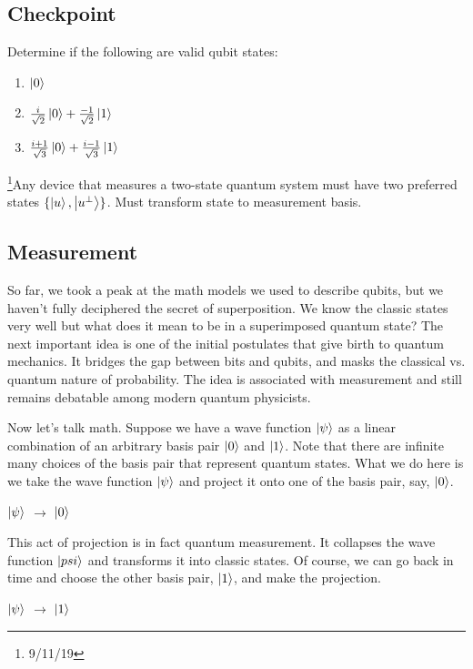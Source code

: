 \documentclass[12pt]{article}
\begin{document}
\subsection{Checkpoint}
Determine if the following are valid qubit states:
\begin{enumerate}
    \item $\ket{0}$
    \item $\frac{i}{\sqrt{2}}\ket{0} + \frac{-1}{\sqrt{2}}\ket{1}$
    \item $\frac{i+1}{\sqrt{3}}\ket{0} + \frac{i-1}{\sqrt{3}}\ket{1}$
\end{enumerate}


\footnote{9/11/19}Any device that measures a two-state quantum system must have
two preferred states $\{\ket{u}, \ket{u^\perp}\}$. Must transform state to
measurement basis.


\subsection {Measurement}

So far, we took a peak at the math models we used to describe qubits, but we haven't fully deciphered the secret of superposition. We know the classic states very well but what does it mean to be in a superimposed quantum state? The next important idea is one of the initial postulates that give birth to quantum mechanics. It bridges the gap between bits and qubits, and masks the classical vs. quantum nature of probability. The idea is associated with measurement and still remains debatable among modern quantum physicists. 

Now let’s talk math. Suppose we have a wave function $\ket{\psi}$ as a linear combination of an arbitrary basis pair $\ket{0}$ and $\ket{1}$. Note that there are infinite many choices of the basis pair that represent quantum states. What we do here is we take the wave function $\ket{\psi}$ and project it onto one of the basis pair, say, $\ket{0}$.\\
\begin{center}
$\ket{\psi}$ $\rightarrow$ $\ket{0}$
\end{center}
This act of projection is in fact quantum measurement. It collapses the wave function $\ket{psi}$ and transforms it into classic states. Of course, we can go back in time and choose the other basis pair, $\ket{1}$, and make the projection.\\
\begin{center}
$\ket{\psi}$ $\rightarrow$ $\ket{1}$
\end{center}
\end{document}
